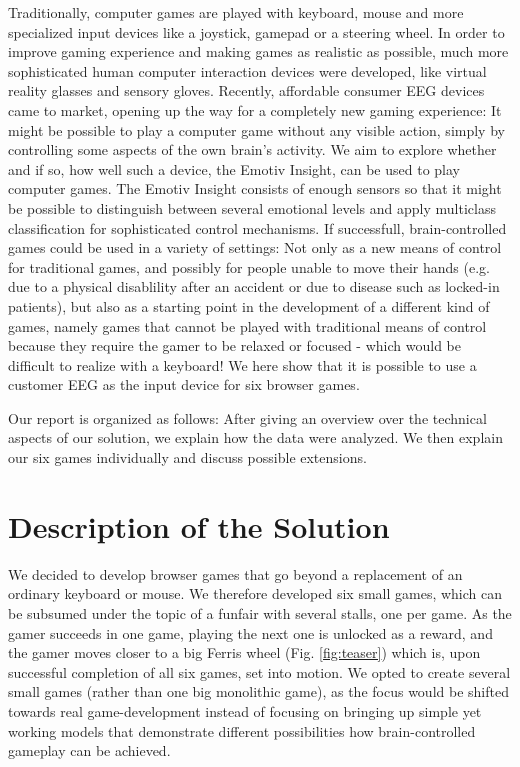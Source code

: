 \documentclass{utue} %
\begin{document}
Traditionally, computer games are played with keyboard, mouse and more specialized input devices like a joystick, gamepad or a steering wheel. In order to improve gaming experience and making games as realistic as possible, much more sophisticated human computer interaction devices were developed, like virtual reality glasses and sensory gloves. Recently, affordable consumer EEG devices came to market, opening up the way for a completely new gaming experience: It might be possible to play a computer game without any visible action, simply by controlling some aspects of the own brain's activity. We aim to explore whether and if so, how well such a device, the Emotiv Insight, can be used to play computer games. The Emotiv Insight consists of enough sensors so that it might be possible to distinguish between several emotional levels and apply multiclass classification for sophisticated control mechanisms. If successfull, brain-controlled games could be used in a variety of settings: Not only as a new means of control for traditional games, and possibly for people unable to move their hands (e.g. due to a physical disablility after an accident or due to disease such as locked-in patients), but also as a starting point in the development of a different kind of games, namely games that cannot be played with traditional means of control because they require the gamer to be relaxed or focused - which would be difficult to realize with a keyboard! We here show that it is possible to use a customer EEG as the input device for six browser games.

Our report is organized as follows: After giving an overview over the technical aspects of our solution, we explain how the data were analyzed. We then explain our six games individually and discuss possible extensions.

\section{Description of the Solution}
We decided to develop browser games that go beyond a replacement of an ordinary keyboard or mouse. We therefore developed six small games, which can be subsumed under the topic of a funfair with several stalls, one per game. As the gamer succeeds in one game, playing the next one is unlocked as a reward, and the gamer moves closer to a big Ferris wheel (Fig. \ref{fig:teaser}) which is, upon successful completion of all six games, set into motion. We opted to create several small games (rather than one big monolithic game), as the focus would be shifted towards real game-development instead of focusing on bringing up simple yet working models that demonstrate different possibilities how brain-controlled gameplay can be achieved.
\end{document}

